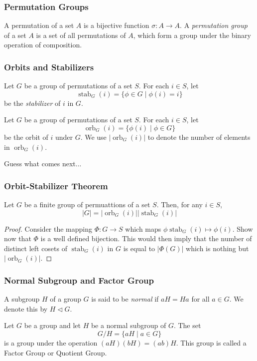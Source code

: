 \documentclass{beamer}
\newcommand{\stab}{\operatorname{stab}}
\newcommand{\orb}{\operatorname{orb}}
\begin{document}
	\begin{frame}
		\frametitle{Permutation Groups}
		\begin{definition}
			A permutation of a set $A$ is a bijective function $\sigma:A\to A$. A \textit{permutation group} of a set $A$ is a set of all permutations of $A$, which form a group under the binary operation of composition.
		\end{definition}
	\end{frame}
	\begin{frame}
		\frametitle{Orbits and Stabilizers}
		\begin{definition}
			Let $G$ be a group of permutations of a set $S$. For each $i\in S$, let 
			\begin{equation*}
				\stab_G(i) = \{\phi\in G\mid \phi(i) = i\}
			\end{equation*}
			be the \textit{stabilizer} of $i$ in $G$.
		\end{definition}
		\begin{definition}
			Let $G$ be a group of permutations of a set $S$. For each $i\in S$, let
			\begin{equation*}
				\orb_G(i) = \{\phi(i)\mid \phi\in G\}
			\end{equation*}
			be the orbit of $i$ under $G$. We use $|\orb_G(i)|$ to denote the number of elements in $\orb_G(i)$.
		\end{definition}
		Guess what comes next...
	\end{frame}
	\begin{frame}
		\frametitle{Orbit-Stabilizer Theorem}
		\begin{theorem}
			Let $G$ be a finite group of permuattions of a set $S$. Then, for any $i\in S$, 
			\begin{equation*}
				|G| = |\orb_G(i)||\stab_G(i)|
			\end{equation*}
		\end{theorem}
		\begin{proof}
			Consider the mapping $\Phi:G\to S$ which maps $\phi\stab_G(i)\mapsto\phi(i)$. Show now that $\Phi$ is a well defined bijection. This would then imply that the number of distinct left cosets of $\stab_G(i)$ in $G$ is equal to $|\Phi(G)|$ which is nothing but $|\orb_G(i)|$.
		\end{proof}
	\end{frame}
	\begin{frame}
		\frametitle{Normal Subgroup and Factor Group}
		\begin{definition}
			A subgroup $H$ of a group $G$ is said to be \textit{normal} if $aH = Ha$ for all $a\in G$. We denote this by $H\vartriangleleft G$.
		\end{definition}
		\begin{theorem}
			Let $G$ be a group and let $H$ be a normal subgroup of $G$. The set 
			\begin{equation*}
				G/H = \{aH\mid a\in G\}
			\end{equation*}
			is a group under the operation $(aH)(bH) = (ab)H$. This group is called a Factor Group or Quotient Group.
		\end{theorem}
	\end{frame}
\end{document}
